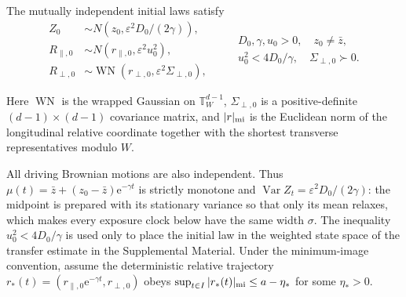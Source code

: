 \documentclass[aps,physrev,reprint,amsmath,amssymb,longbibliography,floatfix]{revtex4-2}
\newcommand{\e}{\mathrm e}
\begin{document}
The mutually independent initial laws satisfy
\begin{equation}
 \begin{aligned}
 Z_0&\sim N\!\left(z_0,\varepsilon^2D_0/(2\gamma)\right),\\
 R_{\parallel,0}&\sim N(r_{\parallel,0},\varepsilon^2u_0^2),\\
 R_{\perp,0}&\sim
 \operatorname{WN}(r_{\perp,0},\varepsilon^2\Sigma_{\perp,0}),
 \end{aligned}
 \qquad
 \begin{gathered}
 D_0,\gamma,u_0>0,\quad z_0\ne\bar z,\\
 u_0^2<4D_0/\gamma,\quad \Sigma_{\perp,0}\succ0.
 \end{gathered}
 \label{eq:exact-m-initial}
\end{equation}

Here $\operatorname{WN}$ is the wrapped Gaussian on
$\mathbb T_W^{d-1}$, $\Sigma_{\perp,0}$ is a positive-definite
$(d-1)\times(d-1)$ covariance matrix, and $|r|_{\rm mi}$ is the Euclidean norm
of the longitudinal relative coordinate together with the shortest transverse
representatives modulo $W$.

All driving Brownian motions are also independent.  Thus
$\mu(t)=\bar z+(z_0-\bar z)\e^{-\gamma t}$ is strictly monotone and
$\operatorname{Var}Z_t=\varepsilon^2D_0/(2\gamma)$: the midpoint is prepared
with its stationary variance so that only its mean relaxes, which makes every
exposure clock below have the same width $\sigma$.  The inequality
$u_0^2<4D_0/\gamma$ is used only to place the initial law in the weighted
state space of the transfer estimate in the Supplemental Material.  Under the
minimum-image
convention, assume the deterministic relative trajectory
$r_*(t)=(r_{\parallel,0}\e^{-\gamma t},r_{\perp,0})$ obeys
$\sup_{t\in I}|r_*(t)|_{\rm mi}\le a-\eta_*$ for some $\eta_*>0$.
\end{document}

